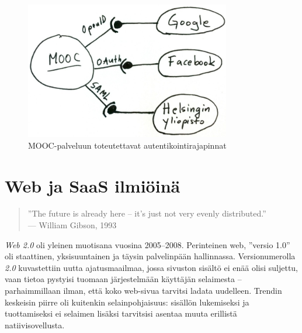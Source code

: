 \documentclass[finnish,gradu]{tktltiki}
\begin{document}
  \begin{figure}
    \centering
    \includegraphics[width=0.8\textwidth]{images/mooc-autentikointirajapinnat.jpg}
    \caption{MOOC-palveluun toteutettavat autentikointirajapinnat}
    \label{fig:mooc-autentikointirajapinnat}
  \end{figure}




\section{Web ja SaaS ilmiöinä} %
\label{sec:web_ja_saas}


  \begin{quote}
    ''The future is already here -- it's just not very evenly distributed.''
    \\ --- William Gibson, 1993
  \end{quote}

  \emph{Web 2.0} oli yleinen muotisana vuosina 2005--2008. Perinteinen web, ''versio 1.0'' oli staattinen, yksisuuntainen ja täysin palvelinpään hallinnassa. Versionumerolla \emph{2.0} kuvastettiin uutta ajatusmaailmaa, jossa sivuston sisältö ei enää olisi suljettu, vaan tietoa pystyisi tuomaan järjestelmään käyttäjän selaimesta -- parhaimmillaan ilman, että koko web-sivua tarvitsi ladata uudelleen. Trendin keskeisin piirre oli kuitenkin selainpohjaisuus: sisällön lukemiseksi ja tuottamiseksi ei selaimen lisäksi tarvitsisi asentaa muuta erillistä natiivisovellusta.
\end{document}
